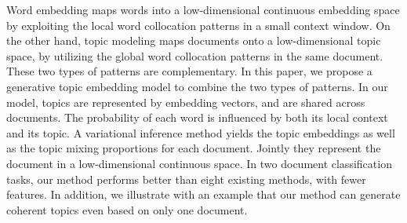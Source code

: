 Word embedding maps words into a low-dimensional continuous embedding space by exploiting the local word collocation patterns in a small context window. On the other hand, topic modeling maps documents onto a low-dimensional topic space, by utilizing the global word collocation patterns in the same document. These two types of patterns are complementary. In this paper, we propose a generative topic embedding model to combine the two types of patterns. In our model, topics are represented by embedding vectors, and are shared across documents. The probability of each word is influenced by both its local context and its topic. A variational inference method yields the topic embeddings as well as the topic mixing proportions for each document. Jointly they represent the document in a low-dimensional continuous space. In two document classification tasks, our method performs better than eight existing methods, with fewer features. In addition, we illustrate with an example that our method can generate coherent topics even based on only one document.
